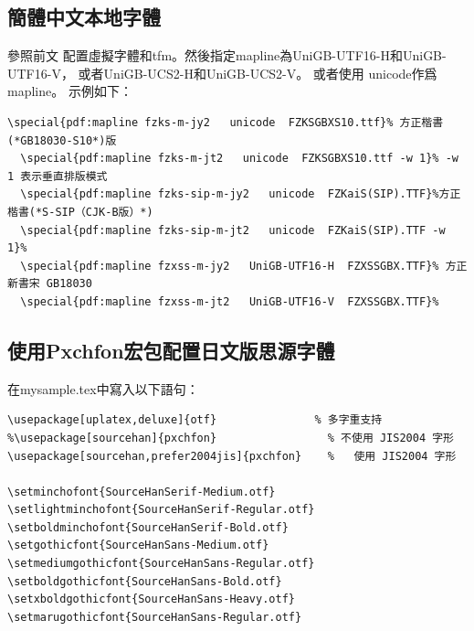 \begin{figure}[H]
\par\quad{}
\begin{center}
\end{center}
\end{figure}

\clearpage
\subsection{簡體中文本地字體}

\par{}參照前文
配置虛擬字體和tfm。然後指定mapline為{UniGB-UTF16-H}和{UniGB-UTF16-V}，
或者{UniGB-UCS2-H}和{UniGB-UCS2-V}。 或者使用 {unicode}作爲{mapline}。
示例如下：

\begin{lstlisting}[firstnumber=1]
  \special{pdf:mapline fzks-m-jy2   unicode  FZKSGBXS10.ttf}% 方正楷書 (*GB18030-S10*)版
  \special{pdf:mapline fzks-m-jt2   unicode  FZKSGBXS10.ttf -w 1}% -w 1 表示垂直排版模式
  \special{pdf:mapline fzks-sip-m-jy2   unicode  FZKaiS(SIP).TTF}%方正楷書(*S-SIP（CJK-B版）*)
  \special{pdf:mapline fzks-sip-m-jt2   unicode  FZKaiS(SIP).TTF -w 1}%
  \special{pdf:mapline fzxss-m-jy2   UniGB-UTF16-H  FZXSSGBX.TTF}% 方正新書宋 GB18030
  \special{pdf:mapline fzxss-m-jt2   UniGB-UTF16-V  FZXSSGBX.TTF}%
\end{lstlisting}

\subsection{使用{Pxchfon}宏包配置日文版思源字體}
\par{}在{mysample.tex}中寫入以下語句：

\begin{lstlisting}[firstnumber=1]
\usepackage[uplatex,deluxe]{otf}               % 多字重支持
%\usepackage[sourcehan]{pxchfon}                 % 不使用 JIS2004 字形
\usepackage[sourcehan,prefer2004jis]{pxchfon}    %   使用 JIS2004 字形

\setminchofont{SourceHanSerif-Medium.otf}
\setlightminchofont{SourceHanSerif-Regular.otf}
\setboldminchofont{SourceHanSerif-Bold.otf}
\setgothicfont{SourceHanSans-Medium.otf}
\setmediumgothicfont{SourceHanSans-Regular.otf}
\setboldgothicfont{SourceHanSans-Bold.otf}
\setxboldgothicfont{SourceHanSans-Heavy.otf}
\setmarugothicfont{SourceHanSans-Regular.otf}
\end{lstlisting}

